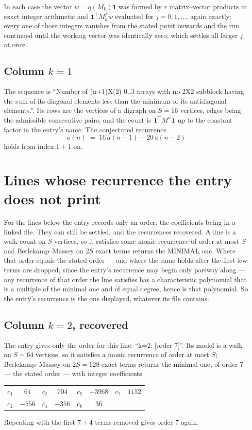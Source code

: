 \documentclass[11pt,a4paper]{article}
\theoremstyle{plain}
\theoremstyle{definition}
\begin{document}
In each case the vector $w=q(M_k)\mathbf{1}$ was formed by $r$ matrix--vector products in
exact integer arithmetic and $\mathbf{1}^{\!\top}M_k^{j}w$ evaluated for $j=0,1,\dots$,
again exactly; every one of those integers vanishes from the stated point onwards and the run
continued until the working vector was identically zero, which settles all larger $j$ at once.

\subsection*{Column $k$$=1$}
The sequence is ``Number of (n+1)X(2) 0..3 arrays with no 2X2 subblock having the sum of its diagonal elements less than the minimum of its antidiagonal elements.''. Its rows are the vertices of a digraph on
$S=16$ vertices, edges being the admissible consecutive pairs, and the count is
$\mathbf{1}^{\!\top}M^{n}\mathbf{1}$ up to the constant factor in the entry's name.
The conjectured recurrence
\[
a(n)\;=\;16\,a(n-1) - 20\,a(n-2)
\]
holds from index $1+1$ on.


\section{Lines whose recurrence the entry does not print}

For the lines below the entry records only an order, the coefficients being in a linked file.
They can still be settled, and the recurrences recovered. A line is a walk count on $S$
vertices, so it satisfies some monic recurrence of order at most $S$ and Berlekamp--Massey on
$2S$ exact terms returns the MINIMAL one. Where that order equals the stated order --- and
where the same holds after the first few terms are dropped, since the entry's recurrence may
begin only partway along --- any recurrence of that order the line satisfies has a
characteristic polynomial that is a multiple of the minimal one and of equal degree, hence is
that polynomial. So the entry's recurrence is the one displayed, whatever its file contains.

\subsection*{Column $k=2$, recovered}
The entry gives only the order for this line: ``k=2: [order 7]''. Its model is a walk on
$S=64$ vertices, so it satisfies a monic recurrence of order at most $S$;
Berlekamp--Massey on $2S=128$ exact terms returns the minimal one, of order
$7$ --- the stated order --- with integer coefficients
\begin{center}\small\begin{tabular}{cccccccc}
$c_{1}$ & $64$ & $c_{3}$ & $704$ & $c_{5}$ & $-3968$ & $c_{7}$ & $1152$ \\
$c_{2}$ & $-556$ & $c_{4}$ & $-356$ & $c_{6}$ & $36$ &  &  \\
\end{tabular}\end{center}
Repeating with the first $7+4$ terms removed gives order $7$ again.
\end{document}
